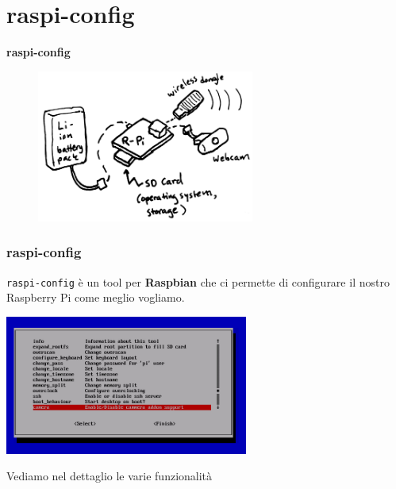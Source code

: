 \documentclass[xcolor=svgnames,11pt]{beamer}
\begin{document}
\section{raspi-config}
\begin{frame}{}
\begin{center}
\begin{Huge}
{\color{green_raspi} \textbf{raspi-config}}
\end{Huge}
\medskip
\begin{figure}
\includegraphics[height=5cm]{meme2.png}
\end{figure}
\end{center}
\end{frame}

\begin{frame}\frametitle{raspi-config}
\texttt{raspi-config} \`e un tool per \textbf{Raspbian} che ci permette di configurare il nostro Raspberry Pi come meglio vogliamo.
\medskip
\begin{center}
\includegraphics[width=8cm]{raspi-config.png}
\end{center}
\medskip
Vediamo nel dettaglio le varie funzionalit\`a
\end{frame}
\end{document}
